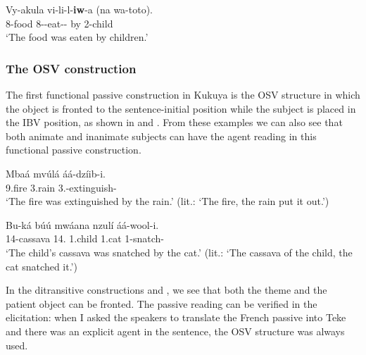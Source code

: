 \documentclass[output=paper,colorlinks,citecolor=brown,
]{langscibook}
\begin{document}
\begin{exe}
\ex
\label{115}
\gll
Vy-akula vi-li-l-\textbf{iw}-a (na wa-toto).\\
8-food 8\Sm{}-\Pst{}-eat-\Pass{}-\Fv{} {\db}by 2-child\\
\trans ‘The food was eaten by children.’ \jambox*{[Swahili G42]}

\end{exe} 
\subsubsection{The OSV construction}\label{teke:sec:4.2.1}
The first functional passive construction in Kukuya is the OSV structure in which the object is fronted to the sentence-initial position while the subject is placed in the IBV position, as shown in  and . From these examples we can also see that both animate and inanimate subjects can have the agent reading in this functional passive construction.
\begin{exe}
\ex
\label{116}
\gll
Mbaá	mvúlá	áá-dzíib-i.\\
9.fire	3.rain	3\Sm{}.\Pst{}-extinguish-\Pst{}\\
\trans ‘The fire was extinguished by the rain.’  (lit.: `The fire, the rain put it out.') 

\end{exe}
\begin{exe}
\ex
\label{117}
\gll
Bu-ká búú mwáana nzulí áá-wool-i.\\
14-cassava 14.\Conn{} 1.child 1.cat 1\Sm{}-snatch-\Pst{}\\
\trans ‘The child's cassava was snatched by the cat.’ (lit.: `The cassava of the child, the cat snatched it.')

\end{exe} 
 In the ditransitive constructions  and , we see that both the theme and the patient object can be fronted. The passive reading can be verified in the elicitation: when I asked the speakers to translate the French passive into Teke and there was an explicit agent in the sentence, the OSV structure was always used.
\end{document}
